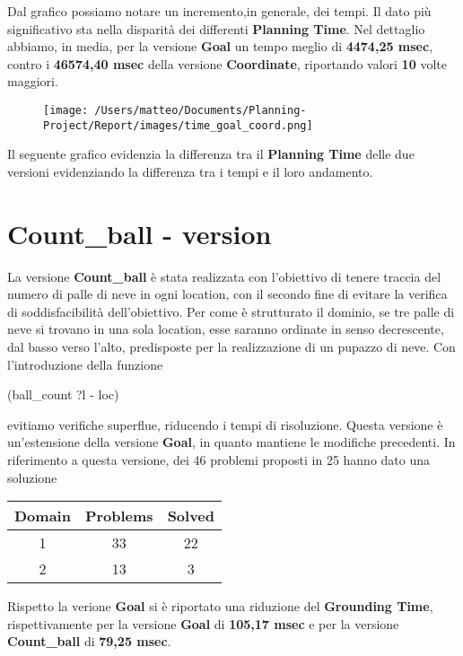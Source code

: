 \documentclass{article}
\begin{document}
\noindent
Dal grafico possiamo notare un incremento,in generale, dei tempi.
Il dato più significativo sta nella disparità dei differenti \textbf{Planning Time}. Nel dettaglio abbiamo, in media, per la versione \textbf{Goal} un tempo meglio di \textbf{4474,25 msec}, contro i \textbf{46574,40 msec} della versione \textbf{Coordinate}, riportando valori \textbf{10} volte maggiori.
\begin{figure}[H]
    \centering
    \texttt{[image: /Users/matteo/Documents/Planning-Project/Report/images/time\_goal\_coord.png]}
    \label{fig:coord_states}
\end{figure}
\noindent
Il seguente grafico evidenzia la differenza tra il \textbf{Planning Time} delle due versioni evidenziando la differenza tra i tempi e il loro andamento.

\section*{Count\_ball - version}
La versione \textbf{Count\_ball} è stata realizzata con l'obiettivo di tenere traccia del numero di palle di neve in ogni location, con il secondo fine di evitare la verifica di soddisfacibilità dell'obiettivo.
Per come è strutturato il dominio, se tre palle di neve si trovano in una sola location, esse saranno ordinate in senso decrescente, dal basso verso l'alto, predisposte per la realizzazione di un pupazzo di neve.
Con l'introduzione della funzione 
\begin{center}
    (ball\_count ?l - loc)
\end{center}
evitiamo verifiche superflue, riducendo i tempi di risoluzione. 
Questa versione è un'estensione della versione \textbf{Goal}, in quanto mantiene le modifiche precedenti.
In riferimento a questa versione, dei 46 problemi proposti in 25 hanno dato una soluzione
\begin{table}[H]
    \centering
    \begin{tabular}{|c|c|c|}
        \hline
        \textbf{Domain} & \textbf{Problems} & \textbf{Solved}\\
        \hline
        1 & 33 & 22 \\
        \hline
        2 & 13 & 3\\
        \hline
    \end{tabular}
\end{table}
\noindent
Rispetto la verione \textbf{Goal} si è riportato una riduzione del \textbf{Grounding Time}, rispettivamente per la versione \textbf{Goal} di \textbf{105,17 msec} e per la versione \textbf{Count\_ball} di \textbf{79,25 msec}. 
\end{document}
